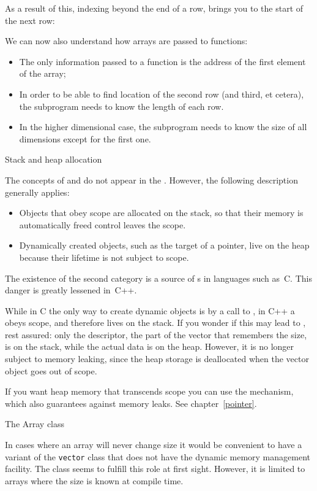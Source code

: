 As a result of this, indexing beyond the end of a row, brings you to the
start of the next row:
%

We can now also understand how arrays are passed to functions:
\begin{itemize}
\item The only information passed to a function is the address of the
  first element of the array;
\item In order to be able to find location of the second row (and
  third, et cetera), the subprogram needs to know the length of each
  row.
\item In the higher dimensional case, the subprogram needs to know the
  size of all dimensions except for the first one.
\end{itemize}

 {Stack and heap allocation}
\label{sec:stack-heap}

The concepts of  and  do not appear
in the . However, the following
description generally applies:
\begin{itemize}
\item Objects that obey scope are allocated on the stack, so that
  their memory is automatically freed control leaves the scope.
\item Dynamically created objects, such as the target of a pointer,
  live on the heap because their lifetime is not subject to scope.
\end{itemize}
The existence of the second category is a source of
s in languages such as~C. This danger is
greatly lessened in~C++.

While in C the only way to create dynamic objects is by a call to
, in C++ a  obeys scope, and
therefore lives on the stack. If you wonder if this may lead to
, rest assured: only the descriptor, the
part of the vector that remembers the size, is on the stack, while the
actual data is on the heap. However, it is no longer subject to memory
leaking, since the heap storage is deallocated when the vector object
goes out of scope.

If you want heap memory that transcends scope you can use the
 mechanism, which also guarantees against
memory leaks. See chapter~\ref{pointer}.

 {The Array class}

In cases where an array will never change size it would be convenient
to have a variant of the \lstinline{vector} class that does not have
the dynamic memory management facility.
The  class seems to fulfill this role at first sight.
However, it
is limited to arrays where the size is known at compile time.

